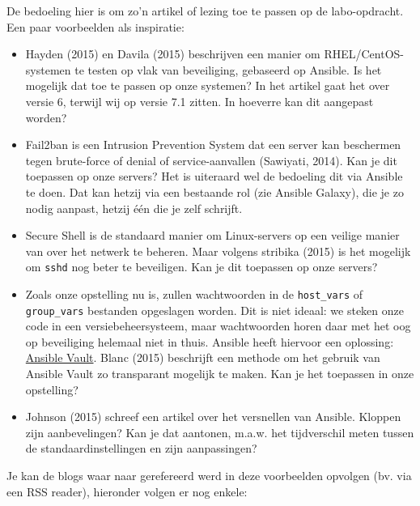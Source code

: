 De bedoeling hier is om zo'n artikel of lezing toe te passen op de
labo-opdracht. Een paar voorbeelden als inspiratie:

\begin{itemize}
\item
  Hayden (2015) en Davila (2015) beschrijven een manier om
  RHEL/CentOS-systemen te testen op vlak van beveiliging, gebaseerd op
  Ansible. Is het mogelijk dat toe te passen op onze systemen? In het
  artikel gaat het over versie 6, terwijl wij op versie 7.1 zitten. In
  hoeverre kan dit aangepast worden?
\item
  Fail2ban is een Intrusion Prevention System dat een server kan
  beschermen tegen brute-force of denial of service-aanvallen (Sawiyati,
  2014). Kan je dit toepassen op onze servers? Het is uiteraard wel de
  bedoeling dit via Ansible te doen. Dat kan hetzij via een bestaande
  rol (zie Ansible Galaxy), die je zo nodig aanpast, hetzij één die je
  zelf schrijft.
\item
  Secure Shell is de standaard manier om Linux-servers op een veilige
  manier van over het netwerk te beheren. Maar volgens stribika (2015)
  is het mogelijk om \texttt{sshd} nog beter te beveiligen. Kan je dit
  toepassen op onze servers?
\item
  Zoals onze opstelling nu is, zullen wachtwoorden in de
  \texttt{host\_vars} of \texttt{group\_vars} bestanden opgeslagen
  worden. Dit is niet ideaal: we steken onze code in een
  versiebeheersysteem, maar wachtwoorden horen daar met het oog op
  beveiliging helemaal niet in thuis. Ansible heeft hiervoor een
  oplossing:
  \href{https://docs.ansible.com/ansible/playbooks_vault.html}{Ansible
  Vault}. Blanc (2015) beschrijft een methode om het gebruik van Ansible
  Vault zo transparant mogelijk te maken. Kan je het toepassen in onze
  opstelling?
\item
  Johnson (2015) schreef een artikel over het versnellen van Ansible.
  Kloppen zijn aanbevelingen? Kan je dat aantonen, m.a.w. het
  tijdverschil meten tussen de standaardinstellingen en zijn
  aanpassingen?
\end{itemize}

Je kan de blogs waar naar gerefereerd werd in deze voorbeelden opvolgen
(bv. via een RSS reader), hieronder volgen er nog enkele:

